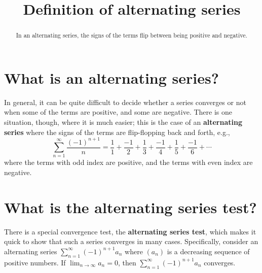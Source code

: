 \documentclass{ximera}
\title{Definition of alternating series}
\begin{document}
\begin{abstract}
  In an alternating series, the signs of the terms flip between being positive and negative.
\end{abstract}

\maketitle

\section{What is an alternating series?}

In general, it can be quite difficult to decide whether a series converges or not when some of the terms are positive, and some are negative.  There is one situation, though, where it is much easier; this is the case of an \textbf{alternating series} where the signs of the terms are flip-flopping back and forth, e.g.,
\[
\sum_{n=1}^\infty \frac{(-1)^{n+1}}{n} = \frac{1}{1} + \frac{-1}{2} + \frac{1}{3} + \frac{-1}{4} + \frac{1}{5} + \frac{-1}{6} + \cdots
\]
where the terms with odd index are positive, and the terms with even index are negative.


\section{What is the alternating series test?}

There is a special convergence test, the \textbf{alternating series test}, which makes it quick to show that such a series converges in many cases.  Specifically, consider an alternating series \(\sum_{n=1}^\infty (-1)^{n+1} a_n\) where \((a_n)\) is a decreasing sequence of positive numbers.  If \(\lim_{n\to\infty}a_n=0\), then \(\sum_{n=1}^\infty (-1)^{n+1} a_n\) converges.

\end{document}
